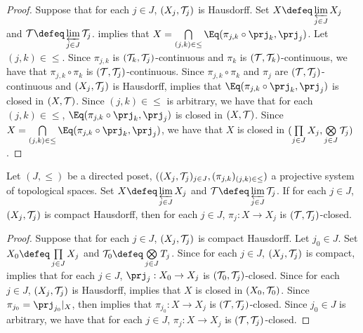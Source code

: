 \documentclass{book}
\begin{document}
\begin{proof}
	Suppose that for each $j \in J$, $(X_j, \mathcal{T}_j)$ is Hausdorff. Set $X \defeq \varprojlim\limits_{j \in J} X_j$ and $\MT \defeq \varprojlim\limits_{j \in J} \MT_j$.  implies that $X = \bigcap\limits_{(j,k) \in {\leq}} \Eq( \pi_{j,k} \circ \prj_k,  \prj_j)$. Let $(j,k) \in {\leq}$. Since $\pi_{j,k}$ is $(\mathcal{T}_k, \mathcal{T}_j)$-continuous and $\pi_k$ is $(\mathcal{T}, \mathcal{T}_k)$-continuous, we have that $\pi_{j,k} \circ \pi_k$ is $(\mathcal{T}, \mathcal{T}_j)$-continuous. Since $\pi_{j,k} \circ \pi_k$ and $\pi_j$ are $(\mathcal{T}, \mathcal{T}_j)$-continuous and $(X_j, \mathcal{T}_j)$ is Hausdorff,  implies that $\Eq( \pi_{j,k} \circ \prj_k,  \prj_j)$ is closed in $(X, \mathcal{T})$. Since $(j,k) \in {\leq}$ is arbitrary, we have that for each $(j,k) \in {\leq}$, $\Eq( \pi_{j,k} \circ \prj_k,  \prj_j)$ is closed in $(X, \mathcal{T})$. Since $X = \bigcap\limits_{(j,k) \in {\leq}} \Eq( \pi_{j,k} \circ \prj_k,  \prj_j)$, we have that $X$ is closed in $(\prod\limits_{j \in J} X_j, \bigotimes\limits_{j \in J} \mathcal{T}_j)$.
\end{proof}

\begin{ex} 
	Let $(J, {\leq})$ be a directed poset, $((X_j, \mathcal{T}_j)_{j \in J}, (\pi_{j,k})_{(j,k) \in \leq})$ a projective system of topological spaces. Set $X \defeq \varprojlim\limits_{j \in J} X_j$ and $\MT \defeq \varprojlim\limits_{j \in J} \MT_j$. If for each $j \in J$, $(X_j, \mathcal{T}_j)$ is compact Hausdorff, then for each $j \in J$, $\pi_j: X \rightarrow X_j$ is $(\mathcal{T}, \mathcal{T}_j)$-closed.
\end{ex}

\begin{proof}
	Suppose that for each $j \in J$, $(X_j, \mathcal{T}_j)$ is compact Hausdorff. Let $j_0 \in J$. Set $X_0 \defeq \prod\limits_{j \in J} X_j$ and $\MT_0 \defeq \bigotimes\limits_{j \in J} T_j$. Since for each $j \in J$, $(X_j, \mathcal{T}_j)$ is compact,  implies that for each $j \in J$, $\prj_j: X_0 \rightarrow X_j$ is $(\mathcal{T}_0, \mathcal{T}_j)$-closed. Since for each $j \in J$, $(X_j, \mathcal{T}_j)$ is Hausdorff,  implies that $X$ is closed in $(X_0, \mathcal{T}_0)$. Since $\pi_{j_0} = \prj_{j_0}|_{X}$,  then implies that $\pi_{j_0}:X \rightarrow X_j$ is $(\mathcal{T}, \mathcal{T}_j)$-closed. Since $j_0 \in J$ is arbitrary, we have that for each $j \in J$, $\pi_j:X \rightarrow X_j$ is $(\mathcal{T}, \mathcal{T}_j)$-closed.
\end{proof}
\end{document}
